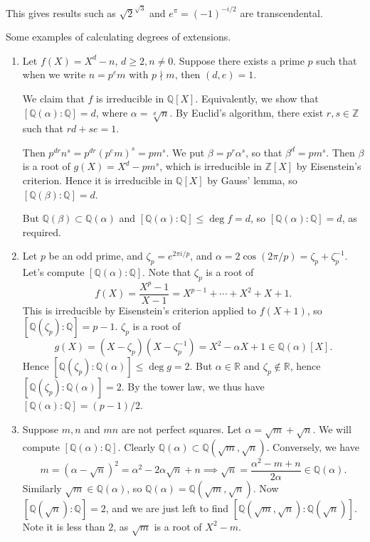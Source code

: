 \documentclass[12pt]{article}
\begin{document}
This gives results such as $\sqrt{2}^{\sqrt 3}$ and $e^{\pi} = (-1)^{-i/2}$ are transcendental.

\begin{exbox}
	Some examples of calculating degrees of extensions.
	\begin{enumerate}
		\item Let $f(X) = X^{d}-n$, $d \geq 2, n \neq 0$. Suppose there exists a prime $p$ such that when we write $n = p^{e}m$ with $p \nmid m$, then $(d, e) = 1$.
	
		We claim that $f$ is irreducible in $\mathbb{Q}[X]$. Equivalently, we show that $[\mathbb{Q}(\alpha):\mathbb{Q}] = d$, where $\alpha = \sqrt[d]n$. By Euclid's algorithm, there exist $r, s \in \mathbb{Z}$ such that $rd + se = 1$.
	
		Then $p^{dr}n^{s} = p^{dr}(p^{e}m)^{s} = p m^{s}$. We put $\beta = p^{r}\alpha^{s}$, so that $\beta^{d} = p m^{s}$. Then $\beta$ is a root of $g(X) = X^{d} - p m^{s}$, which is irreducible in $\mathbb{Z}[X]$ by Eisenstein's criterion. Hence it is irreducible in $\mathbb{Q}[X]$ by Gauss' lemma, so $[\mathbb{Q}(\beta): \mathbb{Q}] = d $.
	
		But $\mathbb{Q}(\beta) \subset \mathbb{Q}(\alpha)$ and $[\mathbb{Q}(\alpha) : \mathbb{Q}] \leq \deg f = d$, so $[\mathbb{Q}(\alpha) : \mathbb{Q}] = d$, as required.
	\item Let $p$ be an odd prime, and $\zeta_p = e^{2\pi i/p}$, and $\alpha = 2 \cos(2\pi/p) = \zeta_p + \zeta_p^{-1}$. Let's compute $[\mathbb{Q}(\alpha): \mathbb{Q}]$. Note that $\zeta_p$ is a root of
		\[
		f(X) = \frac{X^{p}-1}{X-1} = X^{p-1} + \cdots + X^2 + X + 1.
		\]
		This is irreducible by Eisenstein's criterion applied to $f(X+1)$, so $[\mathbb{Q}(\zeta_p): \mathbb{Q}] = p-1$. $\zeta_p$ is a root of
		\[
			g(X) = (X - \zeta_p)(X-\zeta_p^{-1}) = X^2 - \alpha X + 1 \in \mathbb{Q}(\alpha)[X].
		\]
		Hence $[\mathbb{Q}(\zeta_p) : \mathbb{Q}(\alpha)] \leq \deg g = 2$. But $\alpha \in \mathbb{R}$ and $\zeta_p \not \in \mathbb{R}$, hence $[\mathbb{Q}(\zeta_p) : \mathbb{Q}(\alpha)] = 2$. By the tower law, we thus have $[\mathbb{Q}(\alpha) : \mathbb{Q}] = (p-1)/2$.
	\item Suppose $m, n$ and $mn$ are not perfect squares. Let $\alpha = \sqrt m + \sqrt n$. We will compute $[\mathbb{Q}(\alpha): \mathbb{Q}]$. Clearly $\mathbb{Q}(\alpha) \subset \mathbb{Q}(\sqrt m, \sqrt n)$. Conversely, we have
		\[
		m = (\alpha - \sqrt n)^2 = \alpha^2 - 2 \alpha \sqrt n + n \implies \sqrt n = \frac{\alpha^2 - m + n}{2\alpha} \in \mathbb{Q}(\alpha).
		\]
		Similarly $\sqrt m \in \mathbb{Q}(\alpha)$, so $\mathbb{Q}(\alpha) = \mathbb{Q}(\sqrt m, \sqrt n)$. Now $[\mathbb{Q}(\sqrt n) : \mathbb{Q}] = 2$, and we are just left to find $[\mathbb{Q}(\sqrt m, \sqrt n) : \mathbb{Q}(\sqrt n)]$. Note it is less than $2$, as $\sqrt m$ is a root of $X^2 - m$.


\end{enumerate}
\end{exbox}
\end{document}
